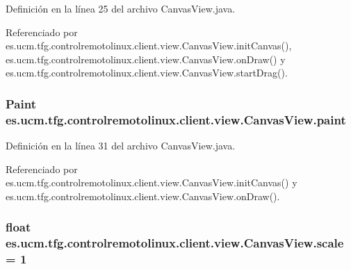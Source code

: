 Definición en la línea 25 del archivo Canvas\-View.\-java.



Referenciado por es.\-ucm.\-tfg.\-controlremotolinux.\-client.\-view.\-Canvas\-View.\-init\-Canvas(), es.\-ucm.\-tfg.\-controlremotolinux.\-client.\-view.\-Canvas\-View.\-on\-Draw() y es.\-ucm.\-tfg.\-controlremotolinux.\-client.\-view.\-Canvas\-View.\-start\-Drag().

\hypertarget{classes_1_1ucm_1_1tfg_1_1controlremotolinux_1_1client_1_1view_1_1CanvasView_ad8c56df91755aa6fde8c87b0b19d2e64}{
\subsubsection[{paint}]{\setlength{\rightskip}{0pt plus 5cm}Paint es.\-ucm.\-tfg.\-controlremotolinux.\-client.\-view.\-Canvas\-View.\-paint\hspace{0.3cm}{\ttfamily [private]}}}\label{classes_1_1ucm_1_1tfg_1_1controlremotolinux_1_1client_1_1view_1_1CanvasView_ad8c56df91755aa6fde8c87b0b19d2e64}


Definición en la línea 31 del archivo Canvas\-View.\-java.



Referenciado por es.\-ucm.\-tfg.\-controlremotolinux.\-client.\-view.\-Canvas\-View.\-init\-Canvas() y es.\-ucm.\-tfg.\-controlremotolinux.\-client.\-view.\-Canvas\-View.\-on\-Draw().

\hypertarget{classes_1_1ucm_1_1tfg_1_1controlremotolinux_1_1client_1_1view_1_1CanvasView_a067c5b12dd207283d5b21a2f6a473f4b}{
\subsubsection[{scale}]{\setlength{\rightskip}{0pt plus 5cm}float es.\-ucm.\-tfg.\-controlremotolinux.\-client.\-view.\-Canvas\-View.\-scale = 1\hspace{0.3cm}{\ttfamily [private]}}}\label{classes_1_1ucm_1_1tfg_1_1controlremotolinux_1_1client_1_1view_1_1CanvasView_a067c5b12dd207283d5b21a2f6a473f4b}


